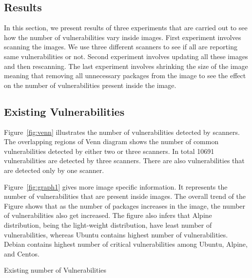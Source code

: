 \documentclass[a4paper,num-refs]{oup-contemporary}
\begin{document}
\begin{Comments}
\section{Results}

In this section, we present results of three experiments that are carried out to see
how the number of vulnerabilities vary inside images. First experiment involves scanning
the images. We use three different scanners
to see if all are reporting same vulnerabilities or not. Second experiment involves updating
all these images and then rescanning. The last experiment involves shrinking the size of the image
meaning that removing all unnecessary packages from the image to see the effect on the number of
vulnerabilities present inside the image.

\subsection{Existing Vulnerabilities}

Figure~\ref{fig:venn} illustrates the number of vulnerabilities detected by scanners. The
overlapping regions of Venn diagram shows the number of common vulnerabilities detected by either two or
three scanners. In total 10691 vulnerabilities are detected by three scanners.
There are also vulnerabilities that are detected only by one scanner.

Figure~\ref{fig:graph1} gives more image specific information.
It represents the number of vulnerabilities that are present inside images.
The overall trend of the Figure shows that as the number of packages increases in the image, the number of vulnerabilities
also get increased.
The figure also infers that Alpine distribution, being the
light-weight distribution, have least number of vulnerabilities, whereas Ubuntu contains highest number of
vulnerabilities. Debian contains highest number of critical vulnerabilities among Ubuntu, Alpine, and Centos.

\begin{table}
%
       \centering
	\caption{\label{table1}Existing number of Vulnerabilities}
\end{table}


\end{Comments}
\end{document}
